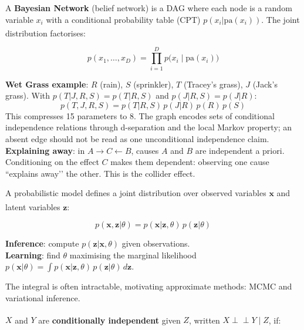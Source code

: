\begin{tcbitemize}[ skin=sectionraster ]
    \tcbitem[title=Bayesian Networks, raster multicolumn=6]
    A \textbf{Bayesian Network} (belief network) is a DAG where each node is
    a random variable $x_i$ with a conditional probability table (CPT)
    $p(x_i | \mathrm{pa}(x_i))$. The joint distribution
    factorises:\textsuperscript{\cite[][pp.~33--40]{barberBayesianReasoningMachine2012}}

    \begin{equation}
        p(x_1, \ldots, x_D) = \prod_{i=1}^{D} p\bigl(x_i \mid \mathrm{pa}(x_i)\bigr)
    \end{equation}

    \textbf{Wet Grass example}: $R$ (rain), $S$ (sprinkler), $T$ (Tracey’s
    grass), $J$ (Jack’s grass). With $p(T|J,R,S)=p(T|R,S)$ and $p(J|R,S)=p(J|R)$:
    \[p(T,J,R,S) = p(T|R,S)\,p(J|R)\,p(R)\,p(S)\]
    This compresses 15 parameters to 8. The graph encodes sets of conditional
    independence relations through d-separation and the local Markov property;
    an absent edge should not be read as one unconditional independence claim.
    \tcblower
    \textbf{Explaining away}: in $A \to C \leftarrow B$, causes $A$ and $B$
    are independent a priori. Conditioning on the effect $C$ makes them
    dependent: observing one cause ``explains away’’ the other.
    This is the collider effect.

    \tcbitem[title=Probabilistic Modelling, raster multicolumn=3]
    A probabilistic model defines a joint distribution over observed variables
    $\mathbf{x}$ and latent variables
    $\mathbf{z}$:\textsuperscript{\cite[][Ch.~1]{barberBayesianReasoningMachine2012}}

    \begin{equation}
        p(\mathbf{x}, \mathbf{z} | \theta) =
            p(\mathbf{x} | \mathbf{z}, \theta)\,p(\mathbf{z}|\theta)
    \end{equation}

    \textbf{Inference}: compute $p(\mathbf{z}|\mathbf{x},\theta)$ given observations.\\
    \textbf{Learning}: find $\theta$ maximising the marginal likelihood
    $p(\mathbf{x}|\theta) = \int p(\mathbf{x}|\mathbf{z},\theta)\,p(\mathbf{z}|\theta)\,d\mathbf{z}$.

    The integral is often intractable, motivating approximate methods:
    MCMC and variational inference.

    \tcbitem[title=Conditional Independence, raster multicolumn=3]
    $X$ and $Y$ are \textbf{conditionally independent} given $Z$, written
    $X \perp\!\!\!\perp Y \mid Z$,
    if:\textsuperscript{\cite[][p.~8]{barberBayesianReasoningMachine2012}}


\end{tcbitemize}
